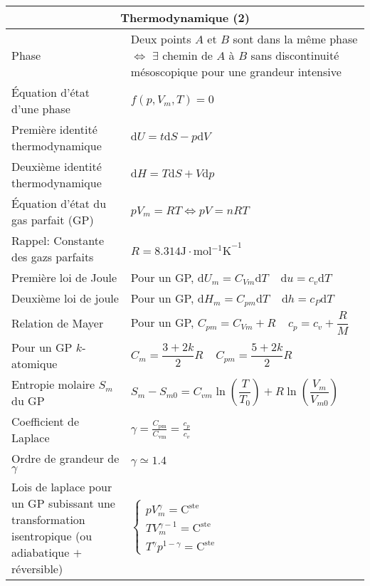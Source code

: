 \documentclass[10pt,a4paper,titlepage,landscape]{article}
\renewcommand{\d}
{
    \mathrm{d}
}
\newcommand{\constant}
{
    \mathrm{C}^{\text{ste}}
}
\renewcommand{\arraystretch}{2}
\begin{document}
\begin{table}[H]
    \centering
    \renewcommand{\arraystretch}{1.5} %
    \setlength{\tabcolsep}{8pt} %
    \begin{tabular}{@{}|p{9cm}|p{10cm}@{}|}
        \multicolumn{2}{c}{\textbf{Thermodynamique (2)}} \\ \hline
            Phase & Deux points $A$ et $B$ sont dans la même phase $\Leftrightarrow$ $\exists$ chemin de $A$ à $B$ sans discontinuité mésoscopique pour une grandeur intensive \\ \hline
            Équation d'état d'une phase & $f\left(p, V_m, T\right) = 0$ \\ \hline
            Première identité thermodynamique & $\d U = t \d S - p\d V$ \\ \hline
            Deuxième identité thermodynamique & $\d H = T \d S + V \d p$ \\ \hline 
            Équation d'état du gas parfait (GP) & $pV_m = RT \Longleftrightarrow pV = nRT$ \\ \hline
            Rappel: Constante des gazs parfaits & $R= 8.314 \unit{\J\cdot\mol^{-1}\kelvin}^{-1}$ \\ \hline
            Première loi de Joule & Pour un GP, $\d U_m  =C_{Vm}\d T \ \ \ \ \ \d u = c_v \d T$ \\ \hline
            Deuxième loi de joule & Pour un GP, $\d H_m = C_{pm} \d T \ \ \ \ \ \d h = c_P \d T$ \\ \hline
            Relation de Mayer & Pour un GP, $C_{pm} = C_{Vm} + R \ \ \ \ \ c_p = c_v + \dfrac{R}{M}$ \\ \hline
            Pour un GP $k$-atomique & $C_m = \dfrac{3 + 2k}{2}R \ \ \ \ \ C_{pm} = \dfrac{5 + 2k}{2}R$ \\ \hline
            Entropie molaire $S_m$ du GP & $S_m - S_{m0} = C_{vm}\ln\left(\dfrac{T}{T_0}\right)+R\ln\left(\dfrac{V_m}{V_{m0}}\right)$ \\ \hline
            Coefficient de Laplace & $\gamma = \frac{C_{\text{pm}}}{C_{\text{vm}}} = \frac{c_p}{c_v}$ \\ \hline
            Ordre de grandeur de $\gamma$ & $\gamma \simeq 1.4$ \\ \hline 
            Lois de laplace pour un GP subissant une transformation isentropique (ou adiabatique $+$ réversible) & $\left\{\begin{array}{l}pV_m^{\gamma} = \constant \\ TV_m^{\gamma - 1} = \constant \\ T^{\gamma}p^{1-\gamma} = \constant \end{array}\right.$ \\ \hline 

\end{tabular}
\end{table}
\end{document}
